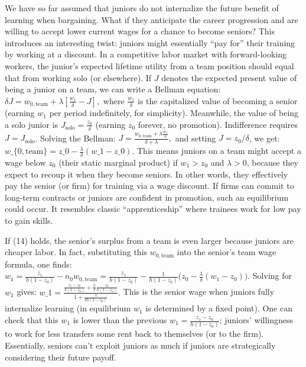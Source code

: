 \documentclass[12pt]{article}
\begin{document}
We have so far assumed that juniors {do not internalize} the future
benefit of learning when bargaining. What if they {anticipate the
career progression} and are willing to accept lower current wages for a
chance to become seniors? This introduces an interesting twist: juniors
might essentially ``pay for'' their training by working at a discount.
In a competitive labor market with forward-looking workers, the junior's
expected lifetime utility from a team position should equal that from
working solo (or elsewhere). If \(J\) denotes the expected {present
value} of being a junior on a team, we can write a {Bellman
equation}:
\(\delta J = w_{0,\text{team}} + \lambda [\frac{w_1}{\delta} - J],\)
where \(\frac{w_1}{\delta}\) is the capitalized value of becoming a
senior (earning \(w_1\) per period indefinitely, for simplicity).
Meanwhile, the value of being a solo junior is
\(J_{\text{solo}} = \frac{z_0}{\delta}\) (earning \(z_0\) forever, no
promotion). Indifference requires \(J = J_{\text{solo}}\). Solving the
Bellman:
\(J = \frac{w_{0,\text{team}} + \lambda \frac{w_1}{\delta}}{\delta + \lambda},\)
and setting \(J = z_0/\delta\), we get: $ w\_\{0,\text{team}\} = z\_0 -
\frac{\lambda}{\delta}(w\_1 - z\_0). \tag{14}$ This means juniors on a
team might accept a wage {below} \(z_0\) (their static marginal
product) if \(w_1 > z_0\) and \(\lambda>0\), because they expect to
recoup it when they become seniors. In other words, they effectively pay
the senior (or firm) for training via a wage discount. If firms can
commit to long-term contracts or juniors are confident in promotion,
such an equilibrium could occur. It resembles classic ``apprenticeship''
where trainees work for low pay to gain skills.

If (14) holds, the senior's surplus from a team is even larger because
juniors are cheaper labor. In fact, substituting this
\(w_{0,\text{team}}\) into the senior's team wage formula, one finds:
\(w_1 = \frac{z_1}{h(1-z_0)} - n_0 w_{0,\text{team}} = \frac{z_1}{h(1-z_0)} - \frac{1}{h(1-z_0)}\Big(z_0 - \frac{\lambda}{\delta}(w_1 - z_0)\Big).\)
Solving for \(w_1\) gives: $ w\_1 =
\frac{\frac{z_1 - z_0}{h(1-z_0)} + \frac{\lambda}{\delta}\frac{z_0}{h(1-z_0)}}{\,1 + \frac{\lambda}{\delta h(1-z_0)}\,}.
\tag{15}$ This is the senior wage when juniors fully internalize
learning (in equilibrium \(w_1\) is determined by a fixed point). One
can check that this \(w_1\) is lower than the previous
\(w_1 = \frac{z_1 - z_0}{h(1-z_0)}\); juniors' willingness to work for
less transfers some rent back to themselves (or to the firm).
Essentially, seniors can't exploit juniors as much if juniors are
strategically considering their future payoff.
\end{document}

